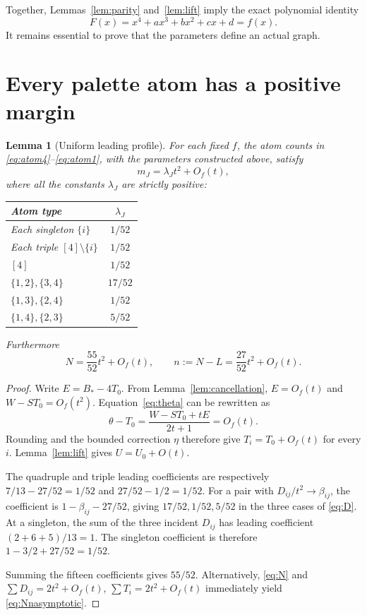 \documentclass[11pt,a4paper]{article}
\newtheorem{lemma}[theorem]{Lemma}
\theoremstyle{definition}
\begin{document}
Together, Lemmas~\ref{lem:parity} and~\ref{lem:lift} imply the exact
polynomial identity
\begin{equation}\label{eq:Fisf}
 F(x)=x^4+ax^3+bx^2+cx+d=f(x).
\end{equation}
It remains essential to prove that the parameters define an actual graph.

\section{Every palette atom has a positive margin}\label{sec:positive}

\begin{lemma}[Uniform leading profile]\label{lem:positive}
For each fixed $f$, the atom counts in
\eqref{eq:atom4}--\eqref{eq:atom1}, with the parameters constructed above,
satisfy
\begin{equation}\label{eq:atomprofile}
 m_J=\lambda_Jt^2+O_f(t),
\end{equation}
where all the constants $\lambda_J$ are strictly positive:
\begin{center}
\begin{tabular}{lc}
\toprule
Atom type & $\lambda_J$\\
\midrule
Each singleton $\{i\}$ & $1/52$\\
Each triple $[4]\setminus\{i\}$ & $1/52$\\
$[4]$ & $1/52$\\
$\{1,2\},\{3,4\}$ & $17/52$\\
$\{1,3\},\{2,4\}$ & $1/52$\\
$\{1,4\},\{2,3\}$ & $5/52$\\
\bottomrule
\end{tabular}
\end{center}
Furthermore
\begin{equation}\label{eq:Nnasymptotic}
 N=\frac{55}{52}t^2+O_f(t),\qquad
 n:=N-L=\frac{27}{52}t^2+O_f(t).
\end{equation}
\end{lemma}
\begin{proof}
Write $E=B_*-4T_0$. From Lemma~\ref{lem:cancellation}, $E=O_f(t)$
and $W-ST_0=O_f(t^2)$. Equation~\eqref{eq:theta} can be rewritten as
\begin{equation}\label{eq:thetadiff}
 \theta-T_0=\frac{W-ST_0+tE}{2t+1}=O_f(t).
\end{equation}
Rounding and the bounded correction $\eta$ therefore give
$T_i=T_0+O_f(t)$ for every $i$. Lemma~\ref{lem:lift} gives
$U=U_0+O(t)$.

The quadruple and triple leading coefficients are respectively
$7/13-27/52=1/52$ and $27/52-1/2=1/52$.
For a pair with $D_{ij}/t^2\longrightarrow\beta_{ij}$, the coefficient
is $1-\beta_{ij}-27/52$, giving $17/52,1/52,5/52$ in the three
cases of \eqref{eq:D}. At a singleton, the sum of the three incident
$D_{ij}$ has leading coefficient $(2+6+5)/13=1$. The singleton
coefficient is therefore $1-3/2+27/52=1/52$.

Summing the fifteen coefficients gives $55/52$. Alternatively,
\eqref{eq:N} and $\sum D_{ij}=2t^2+O_f(t)$,
$\sum T_i=2t^2+O_f(t)$ immediately yield \eqref{eq:Nnasymptotic}.
\end{proof}
\end{document}
